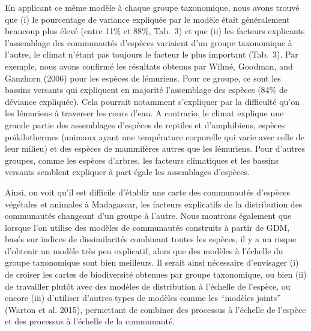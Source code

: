 \documentclass[12pt,]{article}
\begin{document}
En applicant ce même modèle à chaque groupe taxonomique, nous avons
trouvé que (i) le pourcentage de variance expliquée par le modèle était
généralement beaucoup plus élevé (entre 11\% et 88\%, Tab.~3) et que
(ii) les facteurs explicants l'assemblage des communautés d'espèces
variaient d'un groupe taxonomique à l'autre, le climat n'étant pas
toujours le facteur le plus important (Tab.~3). Par exemple, nous avons
confirmé les résultats obtenus par Wilmé, Goodman, and Ganzhorn (2006)
pour les espèces de lémuriens. Pour ce groupe, ce sont les bassins
versants qui expliquent en majorité l'assemblage des espèces (84\% de
déviance expliquée). Cela pourrait notamment s'expliquer par la
difficulté qu'on les lémuriens à traverser les cours d'eau. A contrario,
le climat explique une grande partie des assemblages d'espèces de
reptiles et d'amphibiens, espèces poïkilothermes (animaux ayant une
température corporelle qui varie avec celle de leur milieu) et des
espèces de mammifères autres que les lémuriens. Pour d'autres groupes,
comme les espèces d'arbres, les facteurs climatiques et les bassins
versants semblent expliquer à part égale les assemblages d'espèces.

Ainsi, on voit qu'il est difficile d'établir une carte des communautés
d'espèces végétales et animales à Madagascar, les facteurs explicatifs
de la distribution des communautés changeant d'un groupe à l'autre. Nous
montrons également que lorsque l'on utilise des modèles de communautés
construits à partir de GDM, basés sur indices de dissimilarités
combinant toutes les espèces, il y a un risque d'obtenir un modèle très
peu explicatif, alors que des modèles à l'échelle du groupe taxonomique
sont bien meilleurs. Il serait ainsi nécessaire d'envisager (i) de
croiser les cartes de biodiversité obtenues par groupe taxonomique, ou
bien (ii) de travailler plutôt avec des modèles de distribution à
l'échelle de l'espèce, ou encore (iii) d'utiliser d'autres types de
modèles comme les ``modèles joints'' (Warton et al. 2015), permettant de
combiner des processus à l'échelle de l'espèce et des processus à
l'échelle de la communauté.
\end{document}

